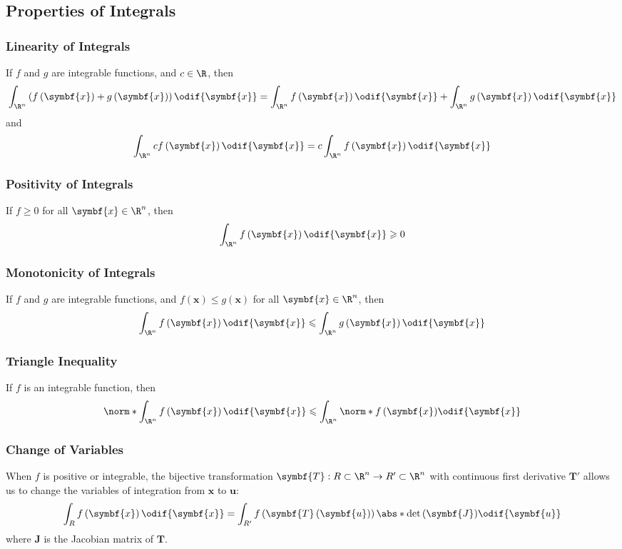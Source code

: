 \documentclass{article}
\begin{document}
\subsection{Properties of Integrals}
\subsubsection*{Linearity of Integrals}
If \(f\) and \(g\) are integrable functions, and \(c \in \R\), then
\begin{equation*}
    \int_{\R^n} \left( f\left( \symbf{x} \right) + g\left( \symbf{x} \right) \right) \odif{\symbf{x}} = \int_{\R^n} f\left( \symbf{x} \right) \odif{\symbf{x}} + \int_{\R^n} g\left( \symbf{x} \right) \odif{\symbf{x}}
\end{equation*}
and
\begin{equation*}
    \int_{\R^n} c f\left( \symbf{x} \right) \odif{\symbf{x}} = c \int_{\R^n} f\left( \symbf{x} \right) \odif{\symbf{x}}
\end{equation*}
\subsubsection*{Positivity of Integrals}
If \(f \geqslant 0\) for all \(\symbf{x} \in \R^n\), then
\begin{equation*}
    \int_{\R^n} f\left( \symbf{x} \right) \odif{\symbf{x}} \geqslant 0
\end{equation*}
\subsubsection*{Monotonicity of Integrals}
If \(f\) and \(g\) are integrable functions, and \(f\left( \symbf{x}
\right) \leqslant g\left( \symbf{x} \right)\) for all \(\symbf{x} \in
\R^n\), then
\begin{equation*}
    \int_{\R^n} f\left( \symbf{x} \right) \odif{\symbf{x}} \leqslant \int_{\R^n} g\left( \symbf{x} \right) \odif{\symbf{x}}
\end{equation*}
\subsubsection*{Triangle Inequality}
If \(f\) is an integrable function, then
\begin{equation*}
    \norm*{\int_{\R^n} f\left( \symbf{x} \right) \odif{\symbf{x}}} \leqslant \int_{\R^n} \norm*{f\left( \symbf{x} \right)} \odif{\symbf{x}}
\end{equation*}
\subsubsection*{Change of Variables}
When \(f\) is positive or integrable, the bijective transformation
\(\symbf{T} : R \subset \R^n \to R' \subset \R^n\) with continuous
first derivative \(\symbf{T}'\) allows us to change the variables of
integration from \(\symbf{x}\) to \(\symbf{u}\):
\begin{equation*}
    \int_{R} f\left( \symbf{x} \right) \odif{\symbf{x}} = \int_{R'} f\left( \symbf{T}\left( \symbf{u} \right) \right) \abs*{\det{\left( \symbf{J} \right)}} \odif{\symbf{u}}
\end{equation*}
where \(\symbf{J}\) is the Jacobian matrix of \(\symbf{T}\).
\end{document}
